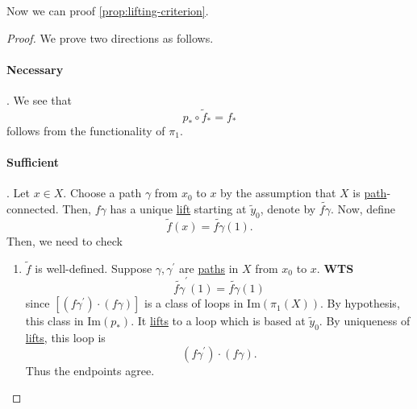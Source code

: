 Now we can proof \autoref{prop:lifting-criterion}.
\begin{proof}\let\qed\relax
	We prove two directions as follows.
	\paragraph{Necessary}. We see that
	\[
		p_\ast \circ \widetilde{f} _\ast = f_\ast
	\]
	follows from the functionality of \(\pi _1\).
	\paragraph{Sufficient}. Let \(x\in X\). Choose a path \(\gamma\) from \(x_0\) to \(x\) by the assumption that \(X\) is \hyperref[def:path]{path}-connected.
	Then, \(f \gamma \) has a unique \hyperref[prop:homotopy-lifting-property]{lift} starting at \(\widetilde{y} _0\), denote by \(\widetilde{f\gamma}\).
	Now, define
	\[
		\widetilde{f} (x) = \widetilde{f \gamma } (1).
	\]
	Then, we need to check
	\begin{enumerate}
		\item \(\widetilde{f} \) is well-defined. Suppose \(\gamma , \gamma ^\prime \) are \hyperref[def:path]{paths} in \(X\) from \(x_0\)
		      to \(x\). \textbf{WTS}
		      \[
			      \widetilde{f \gamma } ^\prime (1) = \widetilde{f \gamma } (1)
		      \]
		      since \([(f \gamma ^\prime)\cdot (f \gamma ) ]\) is a class of loops in \(\mathrm{Im} (\pi _1(X))\). By hypothesis, this class in \(\mathrm{Im} (p_*)\).
		      It \hyperref[prop:homotopy-lifting-property]{lifts} to a loop which is based at \(\widetilde{y} _0\). By uniqueness of \hyperref[prop:homotopy-lifting-property]{lifts}, this loop is
		      \[
			      (f \gamma ^\prime )\cdot (f \gamma ).
		      \]
		      Thus the endpoints agree.
		      \begin{figure}[H]
			      \centering
			      \label{fig:pf:prop:lifting-criterion}
		      \end{figure}
	\end{enumerate}
\end{proof}